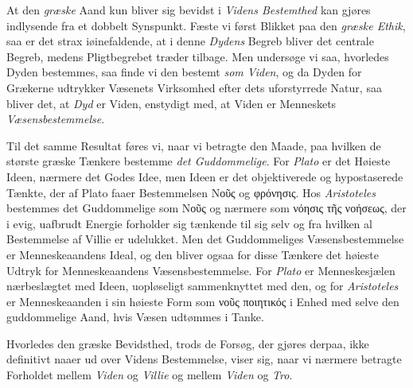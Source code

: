 \documentclass[12pt,a4paper]{book}
\newcommand{\opage}[1]{\marginnote{\footnotesize\textit{[#1]}}}
\begin{document}
At den \emph{græske} Aand kun bliver sig bevidst i \emph{Videns Bestemthed} kan
gjøres indlysende fra et dobbelt Synspunkt. Fæste vi først Blikket paa
den \emph{græske Ethik}, saa er det strax iøinefaldende, at i denne \emph{Dydens} Begreb bliver det centrale Begreb, medens Pligtbegrebet træder
tilbage. Men undersøge vi saa, hvorledes Dyden bestemmes, saa finde vi
den bestemt \emph{som Viden}, og da Dyden for Grækerne udtrykker Væsenets
Virksomhed efter dets uforstyrrede Natur, saa bliver det, at \emph{Dyd} er Viden, enstydigt med, at Viden er Menneskets \emph{Væsensbestemmelse}.

Til det samme Resultat føres vi, naar vi betragte den \opage{12}Maade, paa
hvilken de største græske Tænkere bestemme \emph{det Guddommelige}. For \emph{Plato}
er det Høieste Ideen, nærmere det Godes Idee, men Ideen er det
objektiverede og hypostaserede Tænkte, der af Plato faaer Bestemmelsen
Νοῦς og φρόνησις.
Hos \emph{Aristoteles} bestemmes det Guddommelige som Νοῦς og nærmere som νόησις τῆς νοήσεως,
der i evig, uafbrudt Energie forholder sig tænkende
til sig selv og fra hvilken al Bestemmelse af Villie er udelukket. Men
det Guddommeliges Væsensbestemmelse er Menneskeaandens Ideal, og den
bliver ogsaa for disse Tænkere det høieste Udtryk for Menneskeaandens
Væsensbestemmelse. For \emph{Plato} er Menneskesjælen nærbeslægtet med Ideen,
uopløseligt sammenknyttet med den, og for \emph{Aristoteles} er
Menneskeaanden i sin høieste Form som
νοῦς ποιητικός
i Enhed med selve den guddommelige Aand, hvis
Væsen udtømmes i Tanke.

Hvorledes den græske Bevidsthed, trods de Forsøg, der gjøres derpaa,
ikke definitivt naaer ud over Videns Bestemmelse, viser sig, naar vi
nærmere betragte Forholdet mellem \emph{Viden} og \emph{Villie} og mellem \emph{Viden} og \emph{Tro}.
\end{document}
